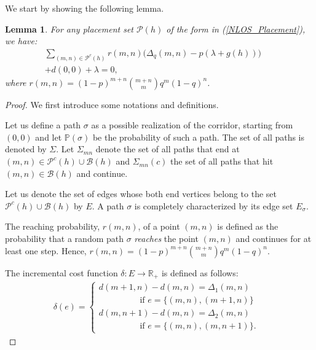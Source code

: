 \documentclass[conference]{IEEEtran}
\newtheorem{lemma}{Lemma}
\begin{document}
We start by showing the following lemma. 
\begin{lemma} \label{g_h_Eqn}
For \emph{any} placement set $\mathcal{P}(h)$ of the form in (\ref{NLOS_Placement}), we have:
\begin{eqnarray} \label{mainEqn_2D}
\sum_{(m,n)\in\mathcal{P}^c(h)}r(m,n)\bigg(\Delta_q(m,n)-p(\lambda+g(h)) \bigg)&& \nonumber \\
+d(0,0)+\lambda=0, &&
\end{eqnarray}
where $r(m,n)=(1-p)^{m+n}\binom{m+n}{m}q^m(1-q)^n$.
\end{lemma}
\begin{proof}
We first introduce some notations and definitions.

Let us define a path $\sigma$ as a possible realization of the corridor, starting from $(0,0)$ and let $\mathbb{P}(\sigma)$ be the probability of such a path. The set of all paths is denoted by $\Sigma$. Let $\Sigma_{mn}$ denote the set of all paths that end at $(m,n)\in \mathcal{P}^c(h)\cup \mathcal{B}(h)$ and $\Sigma_{mn}(c)$ the set of all paths that hit $(m,n)\in \mathcal{B}(h)$ and continue. 

Let us denote the set of edges whose both end vertices belong to the set $\mathcal{P}^c(h)\cup \mathcal{B}(h)$ by $E$. A path $\sigma$ is completely characterized by its edge set ${E}_\sigma$.

The reaching probability, $r(m,n)$, of a point $(m,n)$ is defined as the probability that a random path $\sigma$ \emph{reaches} the point $(m,n)$ and continues for at least one step. Hence, $r(m,n)=(1-p)^{m+n}\binom{m+n}{m}q^m(1-q)^n$.

The incremental cost function  $\delta : E\longrightarrow \mathbb{R}_+$ is defined as follows:
\begin{eqnarray}
\delta(e) = \begin{cases} d(m+1,n)-d(m,n)=\Delta_1(m,n) & \\ \hspace{2cm}\mbox{if } e=\{(m,n),(m+1,n)\} \\
d(m,n+1)-d(m,n)=\Delta_2(m,n) & \\ \hspace{2cm}\mbox{if } e=\{(m,n),(m,n+1)\}. \end{cases} 
\end{eqnarray}


\end{proof}
\end{document}
